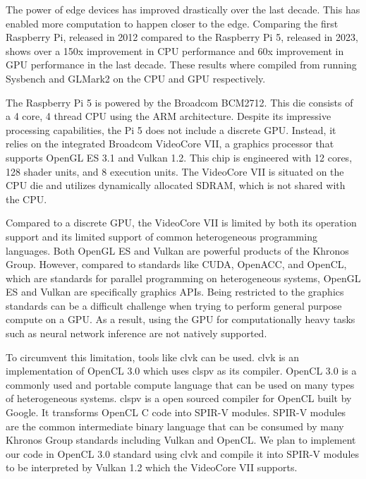 \documentclass[conference]{IEEEtran}
\begin{document}
 The power of edge devices has improved drastically over the last decade. 
 This has enabled more computation to happen closer to the edge. Comparing the 
 first Raspberry Pi, released in 2012 compared to the Raspberry Pi 5, released in 
 2023, shows over a 150x improvement in CPU performance and 60x improvement in 
 GPU performance in the last decade. These results where compiled from running 
 Sysbench and GLMark2 on the CPU and GPU respectively.

 The Raspberry Pi 5 is powered by the Broadcom BCM2712. This die consists of a 
 4 core, 4 thread CPU using the ARM architecture. Despite its impressive processing 
 capabilities, the Pi 5 does not include a discrete GPU. Instead, it relies on the 
 integrated Broadcom VideoCore VII, a graphics processor that supports OpenGL 
 ES 3.1 and Vulkan 1.2. This chip is engineered with 12 cores, 128 shader units, 
 and 8 execution units. The VideoCore VII is situated on the CPU die and utilizes 
 dynamically allocated SDRAM, which is not shared with the CPU. 

 Compared to a discrete GPU, the VideoCore VII is limited by both its operation support and 
 its limited support of common heterogeneous programming languages. Both OpenGL ES and Vulkan are powerful
 products of the Khronos Group. However, compared to standards like CUDA, OpenACC, and OpenCL, which 
 are standards for parallel programming on heterogeneous systems, OpenGL ES and Vulkan are specifically 
 graphics APIs. Being restricted to the graphics standards can be a difficult challenge when trying to 
 perform general purpose compute on a GPU. As a result, using the GPU for computationally heavy tasks such as 
 neural network inference are not natively supported.

 To circumvent this limitation, tools like clvk can be used. clvk is an implementation of OpenCL 3.0 which uses 
 clspv as its compiler. OpenCL 3.0 is a commonly used and portable compute language that can be used on 
 many types of heterogeneous systems. clspv is a open sourced compiler for OpenCL built by Google. It 
 transforms OpenCL C code into SPIR-V modules. SPIR-V modules are the common intermediate binary language that 
 can be consumed by many Khronos Group standards including Vulkan and OpenCL. We plan to implement our code 
 in OpenCL 3.0 standard using clvk and compile it into SPIR-V modules to be interpreted by Vulkan 1.2 which the 
 VideoCore VII supports.
\end{document}
